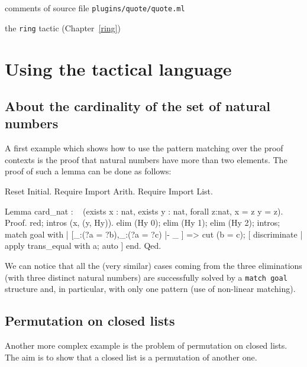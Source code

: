
\SeeAlso comments of source file \texttt{plugins/quote/quote.ml}

\SeeAlso the \texttt{ring} tactic (Chapter~\ref{ring})



\section{Using the tactical language}

\subsection{About the cardinality of the set of natural numbers}

A first example which shows how to use the pattern matching over the proof
contexts is the proof that natural numbers have more than two elements. The
proof of such a lemma can be done as %
follows:
\begin{coq_eval}
Reset Initial.
Require Import Arith.
Require Import List.
\end{coq_eval}
\begin{coq_example*}
Lemma card_nat :
 ~ (exists x : nat, exists y : nat, forall z:nat, x = z \/ y = z).
Proof.
red; intros (x, (y, Hy)).
elim (Hy 0); elim (Hy 1); elim (Hy 2); intros;
 match goal with
 | [_:(?a = ?b),_:(?a = ?c) |- _ ] =>
     cut (b = c); [ discriminate | apply trans_equal with a; auto ]
 end.
Qed.
\end{coq_example*}

We can notice that all the (very similar) cases coming from the three
eliminations (with three distinct natural numbers) are successfully solved by
a {\tt match goal} structure and, in particular, with only one pattern (use
of non-linear matching).

\subsection{Permutation on closed lists}

Another more complex example is the problem of permutation on closed lists. The
aim is to show that a closed list is a permutation of another one.

